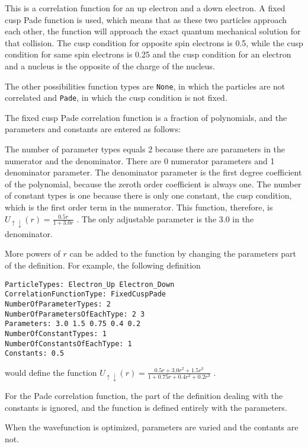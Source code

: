\documentclass[11pt]{article}
\begin{document}
This is a correlation function for an up electron and a down
electron.  A fixed cusp Pade function is used, which means that as
these two particles approach each other, the function will approach
the exact quantum mechanical solution for that collision.  The cusp
condition for opposite spin electrons is 0.5, while the cusp condition
for same spin electrons is 0.25 and the cusp condition for an electron
and a nucleus is the opposite of the charge of the nucleus.

The other possibilities function types are \verb-None-, in which the
particles are not correlated and \verb-Pade-, in which the cusp condition
is not fixed.  

The fixed cusp Pade correlation function is a fraction of polynomials,
and the parameters and constants are entered as follows:

The number of parameter types equals 2 because there are parameters in
the numerator and the denominator.  There are 0 numerator parameters
and 1 denominator parameter.  The denominator parameter is the first
degree coefficient of the polynomial, because the zeroth order
coefficient is always one.  The number of constant types is one
because there is only one constant, the cusp condition, which is the
first order term in the numerator.  This function, therefore, is 
\(
U_{\uparrow \downarrow}(r)=\frac{0.5r}{1+3.0r}
\)
.  The only adjustable parameter is the 3.0 in the denominator. 

More powers of $r$ can be added to the function by changing the
parameters part of the definition.  For example, the following
definition
\begin{verbatim}
ParticleTypes: Electron_Up Electron_Down
CorrelationFunctionType: FixedCuspPade
NumberOfParameterTypes: 2
NumberOfParametersOfEachType: 2 3
Parameters: 3.0 1.5 0.75 0.4 0.2
NumberOfConstantTypes: 1
NumberOfConstantsOfEachType: 1
Constants: 0.5
\end{verbatim}
would define the function 
\(
U_{\uparrow \downarrow}(r)
=\frac{0.5r+3.0r^{2}+1.5r^{3}}{1+0.75r+0.4r^{2}+0.2r^{3}}
\)
.  

For the Pade correlation function, the part of the definition dealing
with the constants is ignored, and the function is defined entirely
with the parameters.

When the wavefunction is optimized, parameters are varied and the
contants are not.  


%
%
\end{document}
